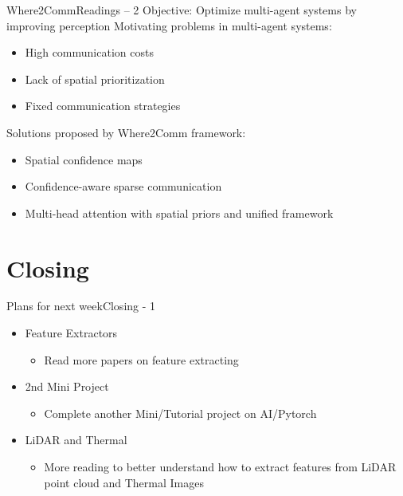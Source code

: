 \documentclass{beamer}
\begin{document}
		\begin{frame}{Where2Comm}{Readings – 2}
			Objective: Optimize multi-agent systems by improving perception
			\vspace{1em}
			Motivating problems in multi-agent systems:
			\begin{itemize}
				\item High communication costs
				\item Lack of spatial prioritization
				\item Fixed communication strategies
			\end{itemize}

			\vspace{1em}
			Solutions proposed by Where2Comm framework:
			\begin{itemize}
				\item Spatial confidence maps
				\item Confidence-aware sparse communication
				\item Multi-head attention with spatial priors and unified framework
			\end{itemize}
		\end{frame}

	\section{Closing}
		\begin{frame}{Plans for next week}{Closing - 1}
			\begin{itemize}
				\item Feature Extractors
				\begin{itemize}
					\item Read more papers on feature extracting
				\end{itemize}
				\item 2nd Mini Project
				\begin{itemize}
					\item Complete another Mini/Tutorial project on AI/Pytorch
				\end{itemize}
				\item LiDAR and Thermal
				\begin{itemize}
					\item More reading to better understand how to extract features from LiDAR point cloud and Thermal Images
				\end{itemize}
			\end{itemize}
		\end{frame}
\end{document}
